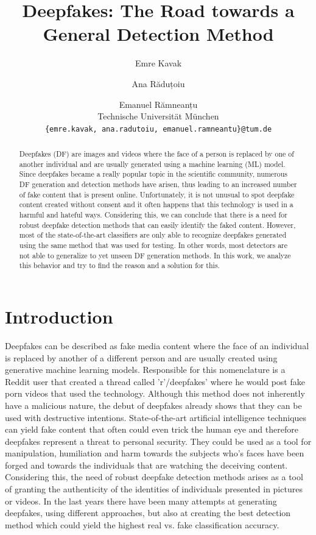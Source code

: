 \documentclass[11pt]{article}
\title{Deepfakes: The Road towards a General Detection Method}
\author{Emre Kavak \and Ana Răduțoiu \and Emanuel Rămneanțu \\
        Technische Universität München \\
        \texttt{ \{emre.kavak, ana.radutoiu, emanuel.ramneantu\}@tum.de }}
\begin{document}
\maketitle
\begin{abstract}
Deepfakes (DF) are images and videos where the face of a person is replaced by one of another individual and are usually generated using a machine learning (ML) model. Since deepfakes became a really popular topic in the scientific community, numerous DF generation and detection methods have arisen, thus leading to an increased number of fake content that is present online. Unfortunately, it is not unusual to spot deepfake content created without consent and it often happens that this technology is used in a harmful and hateful ways. Considering this, we can conclude that there is a need for robust deepfake detection methods that can easily identify the faked content. However, most of the state-of-the-art classifiers are only able to recognize deepfakes generated using the same method that was used for testing. In other words, most detectors are not able to generalize to yet unseen DF generation methods. In this work, we analyze this behavior and try to find the reason and a solution for this. 
\end{abstract}

\section{Introduction}
Deepfakes can be described as fake media content where the face of an individual is replaced by another of a different person and are usually created using generative machine learning models. Responsible for this nomenclature is a Reddit user that created a thread called 'r'/deepfakes' \cite{DF_vice} where he would post fake porn videos that used the technology.  Although this method does not inherently have a malicious nature, the debut of deepfakes already shows that they can be used with destructive intentions. State-of-the-art artificial intelligence techniques can yield fake content that often could even trick the human eye and therefore deepfakes represent a threat to personal security. They could be used as a tool for manipulation, humiliation and harm towards the subjects who's faces have been forged and towards the individuals that are watching the deceiving content.  \\

Considering this, the need of robust deepfake detection methods arises as a tool of granting the authenticity of the identities of individuals presented in pictures or videos. In the last years there have been many attempts at generating deepfakes, using different approaches, but also at creating the best detection method which could yield the highest real vs. fake classification accuracy. 
\end{document}
